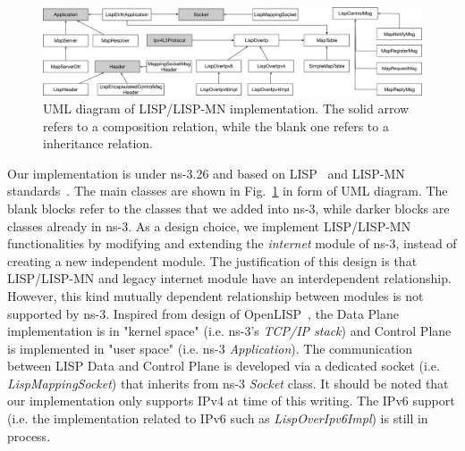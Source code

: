 \begin{figure}[!t]
	\centering
	\includegraphics[width=\textwidth]{Pics/LISP-NS3-UML}
	\caption{UML diagram of LISP/LISP-MN implementation. The solid arrow refers to a composition relation, while the blank one refers to a inheritance relation.}
	\label{LISP-UML}
\end{figure}
Our implementation is under ns-3.26 and based on LISP~\cite{ietf-lisp-rfc6830bis-03} and LISP-MN standards~\cite{meyer-lisp-mn-16}. The main classes are shown in Fig.~\ref{LISP-UML} in form of UML diagram. The blank blocks refer to the classes that we added into ns-3, while darker blocks are classes already in ns-3. As a design choice, we implement LISP/LISP-MN functionalities by modifying and extending the \emph{internet} module of ns-3, instead of creating a new independent module. The justification of this design is that LISP/LISP-MN and legacy internet module have an interdependent relationship. However, this kind mutually dependent relationship between modules is not supported by ns-3. Inspired from design of OpenLISP~\cite{saucez2009openlisp}, the Data Plane implementation is in "kernel space" (i.e. ns-3's \emph{TCP/IP stack}) and Control Plane is implemented in "user space" (i.e. ns-3 \emph{Application}). The communication between LISP Data and Control Plane is developed via a dedicated socket (i.e. \emph{LispMappingSocket}) that inherits from ns-3 \emph{Socket} class. It should be noted that our implementation only supports IPv4 at time of this writing. The IPv6 support (i.e. the implementation related to IPv6 such as \emph{LispOverIpv6Impl}) is still in process.  

